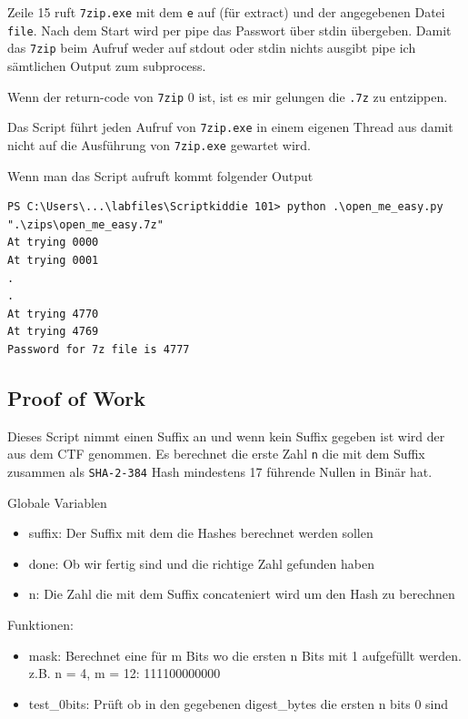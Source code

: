 \documentclass[12pt,a4paper,titlepage,oneside]{scrartcl}
\begin{document}
Zeile 15 ruft \lstinline{7zip.exe} mit dem \lstinline{e} auf (für extract) und der angegebenen Datei \lstinline{file}. Nach dem Start wird per pipe das Passwort über stdin übergeben. Damit das \lstinline{7zip} beim Aufruf weder auf stdout oder stdin nichts ausgibt pipe ich sämtlichen Output zum subprocess.

Wenn der return-code von \lstinline{7zip} 0 ist, ist es mir gelungen die \lstinline{.7z} zu entzippen.

Das Script führt jeden Aufruf von \lstinline{7zip.exe} in einem eigenen Thread aus damit nicht auf die Ausführung von \lstinline{7zip.exe} gewartet wird.

Wenn man das Script aufruft kommt folgender Output
\begin{lstlisting}
PS C:\Users\...\labfiles\Scriptkiddie 101> python .\open_me_easy.py ".\zips\open_me_easy.7z"
At trying 0000
At trying 0001
.
.
At trying 4770
At trying 4769
Password for 7z file is 4777 
\end{lstlisting}

\pagebreak
\subsection{Proof of Work}


Dieses Script nimmt einen Suffix an und wenn kein Suffix gegeben ist wird der aus dem CTF genommen. Es berechnet die erste Zahl \lstinline{n} die mit dem Suffix zusammen als \lstinline{SHA-2-384} Hash mindestens 17 führende Nullen in Binär hat.

Globale Variablen
\begin{itemize}
    \item suffix: Der Suffix mit dem die Hashes berechnet werden sollen
    \item done: Ob wir fertig sind und die richtige Zahl gefunden haben
    \item n: Die Zahl die mit dem Suffix concateniert wird um den Hash zu berechnen
\end{itemize}

Funktionen:
\begin{itemize}
    \item mask: Berechnet eine für m Bits wo die ersten n Bits mit 1 aufgefüllt werden. z.B. n = 4, m = 12: 111100000000
    \item test\_0bits: Prüft ob in den gegebenen digest\_bytes die ersten n bits 0 sind
\end{itemize}
\end{document}
